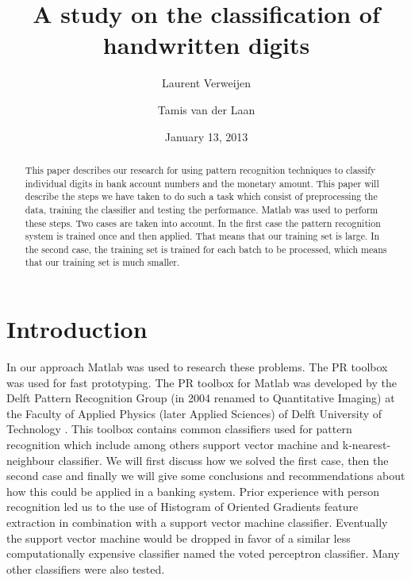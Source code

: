 \documentclass[%
        compressed,
        final,
        notitlepage,
        narroweqnarray,
        inline,
        twoside,
        ]{ieee}
\title{A study on the classification of handwritten digits}
\author{Laurent Verweijen \and Tamis van der Laan}
\date{January 13, 2013}
\begin{document}
\maketitle

\begin{abstract}
    This paper describes our research for using pattern recognition techniques
    to classify individual digits in bank account numbers and the monetary
    amount. This paper will describe the steps we have taken to do such a task
    which consist of preprocessing the data, training the classifier and testing
    the performance. Matlab was used to perform these steps. Two cases are taken
    into account. In the first case the pattern recognition system is trained
    once and then applied. That means that our training set is large. In the
    second case, the training set is trained for each batch to be processed,
    which means that our training set is much smaller.
\end{abstract}

\section{Introduction}

In our approach Matlab was used to research these problems. The PR toolbox was
used for fast prototyping. The PR toolbox for Matlab was developed by the Delft
Pattern Recognition Group (in 2004 renamed to Quantitative Imaging) at the
Faculty of Applied Physics (later Applied Sciences) of Delft University of
Technology \cite{Ferdi}.
This toolbox contains common classifiers used for pattern recognition which
include among others support vector machine and k-nearest-neighbour classifier. We will first
discuss how we solved the first case, then the second case and finally we will
give some conclusions and recommendations about how this could be applied in a
banking system. Prior experience with person recognition \cite{Tamis} led us to
the use of Histogram of Oriented Gradients feature
extraction in combination with a support vector machine classifier. Eventually
the support vector machine would be dropped in favor of a similar less
computationally expensive classifier named the voted perceptron classifier. Many
other classifiers were also tested.
\end{document}
